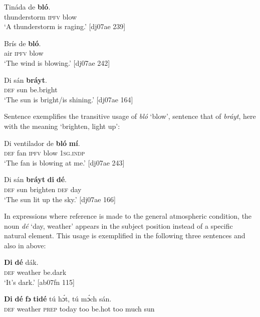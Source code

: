\ea%
    \label{ex:key:1237}
    \gll Tináda      de  \textbf{bló}.\\
thunderstorm  \textsc{ipfv}  blow\\

\glt ‘A thunderstorm is raging.’ [dj07ae 239]
\z


\ea%
    \label{ex:key:1238}
    \gll Brís  de  \textbf{bló}.\\
air  \textsc{ipfv}  blow\\

\glt ‘The wind is blowing.’ [dj07ae 242]
\z


\ea%
    \label{ex:key:1239}
    \gll Di  sán  \textbf{bráyt}.\\
\textsc{def}  sun  be.bright\\

\glt ‘The sun is bright/is shining.’ [dj07ae 164]
\z

Sentence  exemplifies the transitive usage of \textit{bló} ‘blow’, sentence  that of \textit{bráyt}, here with the meaning ‘brighten, light up’:


\ea%
    \label{ex:key:1240}
    \gll Di  ventilador  de  \textbf{bló}    \textbf{mí}.\\
\textsc{def}  fan      \textsc{ipfv}  blow  \textsc{1sg.indp}\\

\glt ‘The fan is blowing at me.’   [dj07ae 243]
\z


\ea%
    \label{ex:key:1241}
    \gll Di  sán  \textbf{bráyt}  \textbf{di}  \textbf{dé}.\\
\textsc{def}  sun  brighten  \textsc{def}  day\\

\glt ‘The sun lit up the sky.’ [dj07ae 166]
\z

In expressions where reference is made to the general atmospheric condition, the noun \textit{dé} ‘day, weather’ appears in the subject position instead of a specific natural element. This usage is exemplified in the following three sentences and also in  above: 


\ea%
    \label{ex:key:1242}
    \gll \textbf{Di}  \textbf{dé}    dák.\\
\textsc{def}  weather  be.dark\\

\glt ‘It’s dark.’ [ab07fn 115]
\z


\ea%
    \label{ex:key:1243}
    \gll \textbf{Di}  \textbf{dé}    \textbf{fɔ}  \textbf{tidé}    tú  hɔ́t,    tú  mɔ́ch  sán.\\
\textsc{def}  weather  \textsc{prep}  today  too  be.hot  too  much  sun\\

